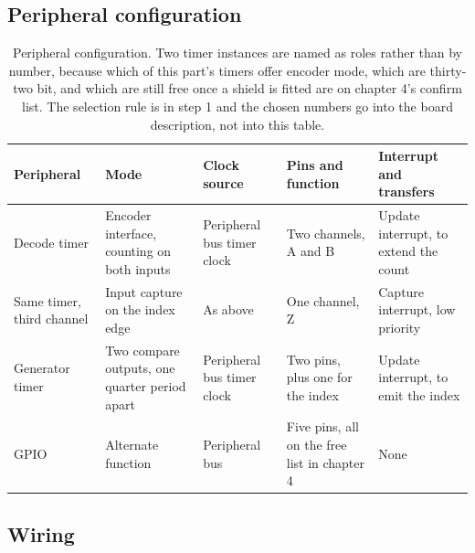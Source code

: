 
\subsection*{Peripheral configuration}

\begin{table}[H]\centering\small
\begin{tabular}{p{22mm}p{26mm}p{24mm}p{30mm}p{30mm}}
\toprule
Peripheral & Mode & Clock source & Pins and function & Interrupt and transfers \\
\midrule
Decode timer & Encoder interface, counting on both inputs & Peripheral bus timer clock & Two channels, A and B & Update interrupt, to extend the count \\
Same timer, third channel & Input capture on the index edge & As above & One channel, Z & Capture interrupt, low priority \\
Generator timer & Two compare outputs, one quarter period apart & Peripheral bus timer clock & Two pins, plus one for the index & Update interrupt, to emit the index \\
GPIO & Alternate function & Peripheral bus & Five pins, all on the free list in chapter 4 & None \\
\bottomrule
\end{tabular}
\caption{Peripheral configuration. Two timer instances are named as roles rather than by number, because which of this part's timers offer encoder mode, which are thirty-two bit, and which are still free once a shield is fitted are on chapter 4's confirm list. The selection rule is in step 1 and the chosen numbers go into the board description, not into this table.}
\end{table}

\subsection*{Wiring}


